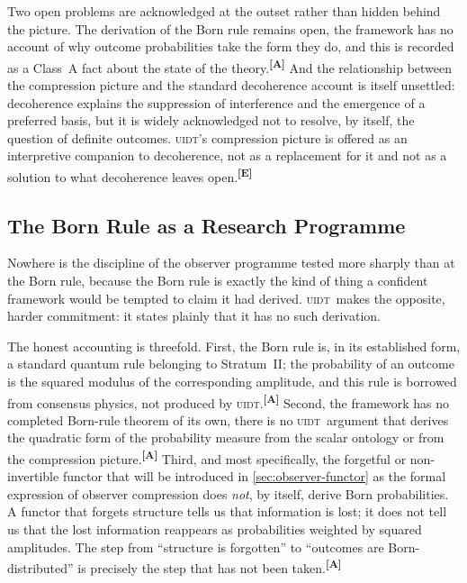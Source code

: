 \documentclass[12pt,a4paper,twoside]{article}
\theoremstyle{plain}
\theoremstyle{definition}
\theoremstyle{remark}
\newcommand{\UIDT}{\textsc{uidt}}
\newcommand{\catmark}[1]{\textsuperscript{\textsf{\textbf{[#1]}}}}
\begin{document}
Two open problems are acknowledged at the outset rather than hidden behind the picture. The derivation of the Born rule remains open, the framework has no account of why outcome probabilities take the form they do, and this is recorded as a Class~A fact about the state of the theory.\catmark{A} And the relationship between the compression picture and the standard decoherence account is itself unsettled: decoherence explains the suppression of interference and the emergence of a preferred basis, but it is widely acknowledged not to resolve, by itself, the question of definite outcomes. \UIDT's compression picture is offered as an interpretive companion to decoherence, not as a replacement for it and not as a solution to what decoherence leaves open.\catmark{E}

\subsection{The Born Rule as a Research Programme}
\label{subsec:born-rule}

Nowhere is the discipline of the observer programme tested more sharply than at the Born rule, because the Born rule is exactly the kind of thing a confident framework would be tempted to claim it had derived. \UIDT\ makes the opposite, harder commitment: it states plainly that it has no such derivation.

The honest accounting is threefold. First, the Born rule is, in its established form, a standard quantum rule belonging to Stratum~II; the probability of an outcome is the squared modulus of the corresponding amplitude, and this rule is borrowed from consensus physics, not produced by \UIDT.\catmark{A} Second, the framework has no completed Born-rule theorem of its own, there is no \UIDT\ argument that derives the quadratic form of the probability measure from the scalar ontology or from the compression picture.\catmark{A} Third, and most specifically, the forgetful or non-invertible functor that will be introduced in \cref{sec:observer-functor} as the formal expression of observer compression does \emph{not}, by itself, derive Born probabilities. A functor that forgets structure tells us that information is lost; it does not tell us that the lost information reappears as probabilities weighted by squared amplitudes. The step from ``structure is forgotten'' to ``outcomes are Born-distributed'' is precisely the step that has not been taken.\catmark{A}
\end{document}
